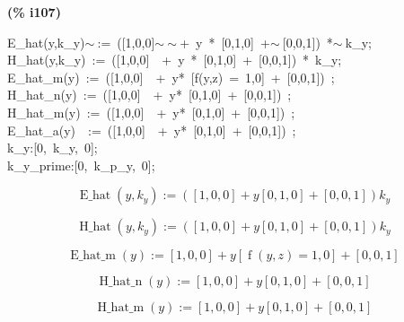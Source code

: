\documentclass[fleqn]{article}
\begin{document}
\noindent
\begin{minipage}[t]{4.000000em}\color{red}\bfseries
(\% i107)	
\end{minipage}
\begin{minipage}[t]{\textwidth}\color{blue}
E\_hat(y,k\_y)\ensuremath{\sim\ }:=\ ([1,0,0]\ensuremath{\sim\ }\ensuremath{\sim\ }+\ y\ *\ [0,1,0]\ +\ensuremath{\sim\ }[0,0,1])\ *\ensuremath{\sim\ }k\_y;\\
H\_hat(y,k\_y)\ :=\ ([1,0,0]\ \ +\ y\ *\ [0,1,0]\ +\ [0,0,1])\ *\ k\_y;\\
E\_hat\_m(y)\ :=\ ([1,0,0]\ \ +\ y*\ [f(y,z)\ =\ 1,0]\ +\ [0,0,1])\ ;\\
H\_hat\_n(y)\ :=\ ([1,0,0]\ \ +\ y*\ [0,1,0]\ +\ [0,0,1])\ ;\\
H\_hat\_m(y)\ :=\ ([1,0,0]\ \ +\ y*\ [0,1,0]\ +\ [0,0,1])\ ;\\
E\_hat\_a(y)\ \ :=\ ([1,0,0]\ \ +\ y*\ [0,1,0]\ +\ [0,0,1])\ ;\\
k\_y:[0,\ k\_y,\ 0];\\
k\_y\_prime:[0,\ k\_p\_y,\ 0];
\end{minipage}
\[\displaystyle \tag{\% o100} 
\operatorname{E\_ hat}\left( y\operatorname{,}{k_y}\right) \operatorname{:=}\left( \left[ 1\operatorname{,}0\operatorname{,}0\right] +y \left[ 0\operatorname{,}1\operatorname{,}0\right] +\left[ 0\operatorname{,}0\operatorname{,}1\right] \right)  {k_y}\mbox{}\]

\[\tag{\% o101} 
\operatorname{H\_ hat}\left( y\operatorname{,}{k_y}\right) \operatorname{:=}\left( \left[ 1\operatorname{,}0\operatorname{,}0\right] +y \left[ 0\operatorname{,}1\operatorname{,}0\right] +\left[ 0\operatorname{,}0\operatorname{,}1\right] \right)  {k_y}\mbox{}\]

\[\tag{\% o102} 
\operatorname{E\_ hat\_ m}(y)\operatorname{:=}\left[ 1\operatorname{,}0\operatorname{,}0\right] +y \left[ \operatorname{f}\left( y\operatorname{,}z\right) =1\operatorname{,}0\right] +\left[ 0\operatorname{,}0\operatorname{,}1\right] \mbox{}\]

\[\tag{\% o103} 
\operatorname{H\_ hat\_ n}(y)\operatorname{:=}\left[ 1\operatorname{,}0\operatorname{,}0\right] +y \left[ 0\operatorname{,}1\operatorname{,}0\right] +\left[ 0\operatorname{,}0\operatorname{,}1\right] \mbox{}\]

\[\tag{\% o104} 
\operatorname{H\_ hat\_ m}(y)\operatorname{:=}\left[ 1\operatorname{,}0\operatorname{,}0\right] +y \left[ 0\operatorname{,}1\operatorname{,}0\right] +\left[ 0\operatorname{,}0\operatorname{,}1\right] \mbox{}\]
\end{document}
